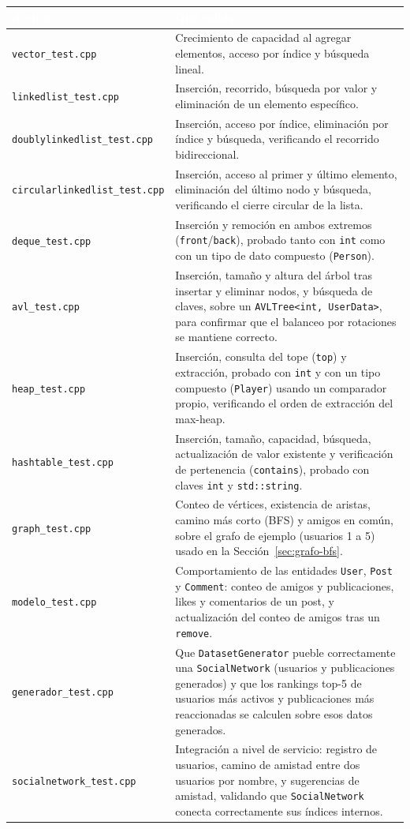 \documentclass[11pt,a4paper]{article}
\begin{document}
\begin{center}
\begin{tabularx}{\textwidth}{@{}l X@{}}
\toprule
\rowcolor{tablehead}
\textcolor{white}{\textbf{Archivo}} & \textcolor{white}{\textbf{Qué valida}} \\
\midrule
\texttt{vector\_test.cpp} &
Crecimiento de capacidad al agregar elementos, acceso por índice y
búsqueda lineal. \\
\texttt{linkedlist\_test.cpp} &
Inserción, recorrido, búsqueda por valor y eliminación de un elemento
específico. \\
\texttt{doublylinkedlist\_test.cpp} &
Inserción, acceso por índice, eliminación por índice y búsqueda,
verificando el recorrido bidireccional. \\
\texttt{circularlinkedlist\_test.cpp} &
Inserción, acceso al primer y último elemento, eliminación del último
nodo y búsqueda, verificando el cierre circular de la lista. \\
\texttt{deque\_test.cpp} &
Inserción y remoción en ambos extremos (\texttt{front}/\texttt{back}),
probado tanto con \texttt{int} como con un tipo de dato compuesto
(\texttt{Person}). \\
\texttt{avl\_test.cpp} &
Inserción, tamaño y altura del árbol tras insertar y eliminar nodos, y
búsqueda de claves, sobre un \texttt{AVLTree<int, UserData>}, para
confirmar que el balanceo por rotaciones se mantiene correcto. \\
\texttt{heap\_test.cpp} &
Inserción, consulta del tope (\texttt{top}) y extracción, probado con
\texttt{int} y con un tipo compuesto (\texttt{Player}) usando un
comparador propio, verificando el orden de extracción del max-heap. \\
\texttt{hashtable\_test.cpp} &
Inserción, tamaño, capacidad, búsqueda, actualización de valor
existente y verificación de pertenencia (\texttt{contains}), probado con
claves \texttt{int} y \texttt{std::string}. \\
\texttt{graph\_test.cpp} &
Conteo de vértices, existencia de aristas, camino más corto (BFS) y
amigos en común, sobre el grafo de ejemplo (usuarios 1 a 5) usado en la
Sección~\ref{sec:grafo-bfs}. \\
\texttt{modelo\_test.cpp} &
Comportamiento de las entidades \texttt{User}, \texttt{Post} y
\texttt{Comment}: conteo de amigos y publicaciones, likes y comentarios
de un post, y actualización del conteo de amigos tras un
\texttt{remove}. \\
\texttt{generador\_test.cpp} &
Que \texttt{DatasetGenerator} pueble correctamente una
\texttt{SocialNetwork} (usuarios y publicaciones generados) y que los
rankings top-5 de usuarios más activos y publicaciones más reaccionadas
se calculen sobre esos datos generados. \\
\texttt{socialnetwork\_test.cpp} &
Integración a nivel de servicio: registro de usuarios, camino de
amistad entre dos usuarios por nombre, y sugerencias de amistad,
validando que \texttt{SocialNetwork} conecta correctamente sus índices
internos. \\
\bottomrule
\end{tabularx}
\end{center}
\end{document}
